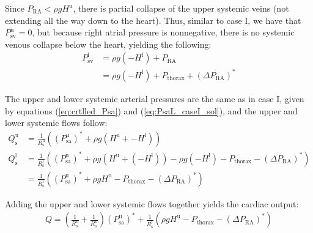\documentclass[12pt]{article}
\begin{document}
Since $P_\text{RA}<\rho g H^\text{u}$, there is partial collapse of the upper systemic veins (not extending all the way down to the heart). Thus, similar to case I, we have that $P_\text{sv}^\text{u} = 0$, but because right atrial pressure is nonnegative, there is no systemic venous collapse below the heart, yielding the following: 
\begin{align}
    P_\text{sv}^\text{l} &= \rho g (-H^\text{l}) + P_\text{RA}\\
    &= \rho g (-H^\text{l}) + P_\text{thorax} +\left( \Delta P_{\text{RA}}\right)^*
\end{align}

The upper and lower systemic arterial pressures are the same as in case I, given by equations (\ref{eq:crtlled_Psa}) and (\ref{eq:PsaL_caseI_sol}), and the upper and lower systemic flows follow: 
\begin{align}
    Q_\text{s}^\text{u} &= \frac{1}{R_\text{s}^\text{u}}\left((P_\text{sa}^\text{u})^*+\rho g (H^\text{u} + -H^\text{l}) \right) \\
    Q_\text{s}^\text{l} &= \frac{1}{R_\text{s}^\text{l}}\left((P_{\text{sa}}^\text{u})^{*}+\rho g\left(H^\text{u}+(-H^{\text{l}})\right) - \rho g (-H^\text{l}) - P_\text{thorax} - \left( \Delta P_\text{RA} \right)^*\right)\\
    &= \frac{1}{R_\text{s}^\text{l}}\left( (P_\text{sa}^\text{u})^*+\rho g H^\text{u} - P_\text{thorax} - \left( \Delta P_\text{RA} \right)^*\right)
 \end{align}

Adding the upper and lower systemic flows together yields the cardiac output: 
\begin{align}
Q = \left(\frac{1}{R_\text{s}^\text{u}} + \frac{1}{R_\text{s}^\text{u}}\right) (P_\text{sa}^\text{u})^* + \frac{1}{R_\text{s}^\text{l}} \left(\rho g H^\text{u} - P_\text{thorax} - \left( \Delta P_\text{RA} \right)^*\right)
\end{align}
\end{document}
